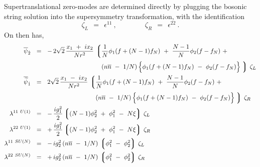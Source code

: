 \documentclass{article}
\newcommand{\wt}{\widetilde}
\newcommand{\ov}{\overline}
\newcommand{\lgr}{\left\lgroup}
\newcommand{\rgr}{\right\rgroup}
\newcommand{\zr}{\zeta_R}
\newcommand{\zl}{\zeta_L}
\newcommand{\nbar}{\ov{n}}
\begin{document}
Supertranslational zero-modes are determined directly by plugging the bosonic string solution into the
supersymmetry transformation, with the identification 
\[
	\zl ~~=~~ \epsilon^{11}~,  \qquad\qquad   \zr ~~=~~ \epsilon^{22}~.
\]
On then has,
\begin{align}
\label{N2_strans}
%
\notag
\ov{\psi}_{\dot{2}}	& ~~=~~  -\,  2\sqrt{2}\, \frac{x_1 ~+~ i x_2}{N r^2} \,
		\lgr \frac{1}{N} \phi_1 ( f + (N-1) f_N ) ~+~ \frac{N-1}{N} \phi_2 ( f - f_N ) ~+~ \right.
		\\
%
\notag
			& \phantom{~~=~~  -\,  2\sqrt{2}\, \frac{x_1 ~+~ i x_2}{N r^2} \,\lgr \right.}
			\left( n\nbar ~-~ 1/N \right )
			\Bigl\{ \phi_1 ( f + ( N-1 ) f_N ) ~-~ \phi_2 ( f - f_N) \Bigr\}
		\left. \rgr\, \zeta_L 
		\\
%
\notag
\ov{\wt{\psi}}_{\dot{1}} & ~~=~~    2\sqrt{2} \, \frac{x_1 ~-~ i x_2}{N r^2} \,
		\lgr \frac{1}{N} \phi_1 ( f + (N-1) f_N ) ~+~ \frac{N-1}{N} \phi_2 ( f - f_N ) ~+~ \right.
		\\
%
\notag
			& \phantom{~~=~~    2\sqrt{2} \, \frac{x_1 ~-~ i x_2}{N r^2} \,\lgr \right.}
			\left( n\nbar ~-~ 1/N \right )
			\Bigl\{ \phi_1 ( f + ( N-1 ) f_N ) ~-~ \phi_2 ( f - f_N) \Bigr\}
		\left. \rgr\, \zeta_R
		\\
%
\lambda^{11\ U(1)} 	& ~~=~~ -\, \frac{i g_1^2}{2} \lgr (N-1)\phi_2^2  ~+~ \phi_1^2 ~-~ N\xi \rgr \, \zeta_L 
		\\
%
\notag
\lambda^{22\ U(1)} 	& ~~=~~ +\, \frac{i g_1^2}{2} \lgr (N-1)\phi_2^2  ~+~ \phi_1^2 ~-~ N\xi \rgr \, \zeta_R 
		\\
%
\notag
\lambda^{11\ SU(N)}	& ~~=~~ -\, {i g_2^2}\, ( n\nbar ~-~ 1/N )\, \lgr \phi_1^2 ~-~ \phi_2^2 \rgr\, \zeta_L
		\\
%
\notag
\lambda^{22\ SU(N)}	& ~~=~~ +\, {i g_2^2}\, ( n\nbar ~-~ 1/N )\, \lgr \phi_1^2 ~-~ \phi_2^2 \rgr\, \zeta_R
\end{align}
\end{document}
